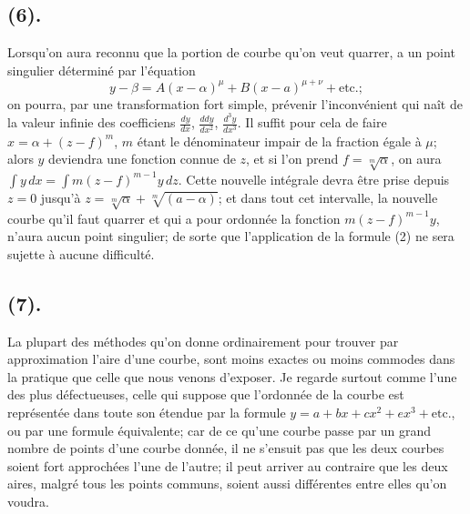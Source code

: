 \documentclass{article}
\begin{document}
\subsection*{(6).}

Lorsqu'on aura reconnu que la portion de courbe qu'on veut quarrer, a un point singulier déterminé par l'équation
\[ y-\beta=A(x-\alpha)^{\mu}+B(x-a)^{\mu+\nu}+\text{etc.}; \]
on pourra, par une transformation fort simple, prévenir l'inconvénient qui naît de la valeur infinie des coefficiens $\frac{dy}{dx}$, $\frac{ddy}{dx^{2}}$, $\frac{d^{3}y}{dx^{3}}$. Il suffit pour cela de faire $x=\alpha+(z-f)^{m}$, $m$ étant le dénominateur impair de la fraction égale à $\mu$; alors $y$ deviendra une fonction connue de $z$, et si l'on prend $f=\sqrt[m]{\alpha}$, on aura $\displaystyle\int y\,dx=\displaystyle\int m(z-f)^{m-1}y\,dz$. Cette nouvelle intégrale devra être prise depuis $z=0$ jusqu'à $z=\sqrt[m]{\alpha}+\sqrt[m]{(a-\alpha)}$; et dans tout cet intervalle, la nouvelle courbe qu'il faut quarrer et qui a pour ordonnée la fonction $m(z-f)^{m-1}y$, n'aura aucun point singulier; de sorte que l'application de la formule (2) ne sera sujette à aucune difficulté.

\subsection*{(7).}

La plupart des méthodes qu'on donne ordinairement pour trouver par approximation l'aire d'une courbe, sont moins exactes ou moins commodes dans la pratique que celle que nous venons d'exposer. Je regarde surtout comme l'une des plus défectueuses, celle qui suppose que l'ordonnée de la courbe est représentée dans toute son étendue par la formule $y=a+bx+cx^{2}+ex^{3}+\text{etc.}$, ou par une formule équivalente; car de ce qu'une courbe passe par un grand nombre de points d'une courbe donnée, il ne s'ensuit pas que les deux courbes soient fort approchées l'une de l'autre; il peut arriver au contraire que les deux aires, malgré tous les points communs, soient aussi différentes entre elles qu'on voudra.
\end{document}
